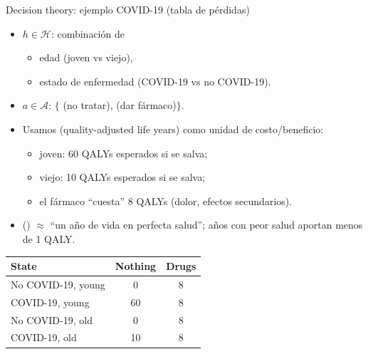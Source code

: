 \begin{frame}{Decision theory: ejemplo COVID-19 (tabla de pérdidas)}
\small
\begin{itemize}
  \item {} \(h\in\mathcal{H}\): combinación de
  \begin{itemize}
    \item edad (joven vs viejo),
    \item estado de enfermedad (COVID-19 vs no COVID-19).
  \end{itemize}
  \item {} \(a\in\mathcal{A}\): \(\{\) (no tratar),  (dar fármaco)\(\}\).
  \item Usamos  (quality-adjusted life years) como unidad de costo/beneficio:
  \begin{itemize}\small
    \item joven: 60 QALYs esperados si se salva;
    \item viejo: 10 QALYs esperados si se salva;
    \item el fármaco “cuesta” 8 QALYs (dolor, efectos secundarios).
  \end{itemize}
  \item {} () \(\approx\) “un año de vida en perfecta salud”; años con peor salud aportan menos de 1 QALY.
\end{itemize}

\vspace{-0.6em}
\centering
\begin{tabular}{lcc}
  \toprule
  \textbf{State} & \textbf{Nothing} & \textbf{Drugs} \\
  \midrule
  No COVID-19, young  & 0  & 8 \\
  COVID-19, young     & 60 & 8 \\
  No COVID-19, old    & 0  & 8 \\
  COVID-19, old       & 10 & 8 \\
  \bottomrule
\end{tabular}

\end{frame}


